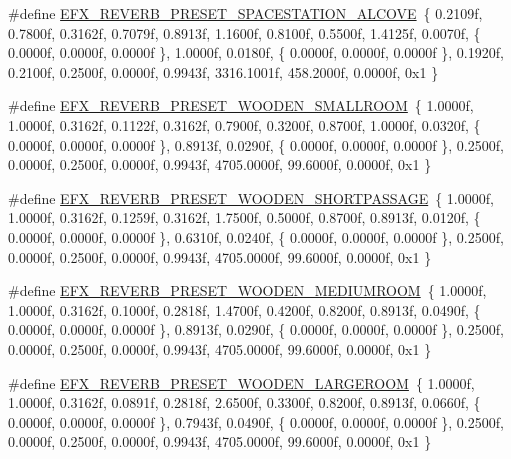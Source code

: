 \begin{DoxyCompactItemize}
\item 
\#define \mbox{\hyperlink{efx-presets_8h_aa9d3471810ca5d80f56f18841dd3abc8}{E\+F\+X\+\_\+\+R\+E\+V\+E\+R\+B\+\_\+\+P\+R\+E\+S\+E\+T\+\_\+\+S\+P\+A\+C\+E\+S\+T\+A\+T\+I\+O\+N\+\_\+\+A\+L\+C\+O\+VE}}~\{ 0.\+2109f, 0.\+7800f, 0.\+3162f, 0.\+7079f, 0.\+8913f, 1.\+1600f, 0.\+8100f, 0.\+5500f, 1.\+4125f, 0.\+0070f, \{ 0.\+0000f, 0.\+0000f, 0.\+0000f \}, 1.\+0000f, 0.\+0180f, \{ 0.\+0000f, 0.\+0000f, 0.\+0000f \}, 0.\+1920f, 0.\+2100f, 0.\+2500f, 0.\+0000f, 0.\+9943f, 3316.\+1001f, 458.\+2000f, 0.\+0000f, 0x1 \}
\item 
\#define \mbox{\hyperlink{efx-presets_8h_ab8ae77e2171d3d32a6f70b46ed47c6ff}{E\+F\+X\+\_\+\+R\+E\+V\+E\+R\+B\+\_\+\+P\+R\+E\+S\+E\+T\+\_\+\+W\+O\+O\+D\+E\+N\+\_\+\+S\+M\+A\+L\+L\+R\+O\+OM}}~\{ 1.\+0000f, 1.\+0000f, 0.\+3162f, 0.\+1122f, 0.\+3162f, 0.\+7900f, 0.\+3200f, 0.\+8700f, 1.\+0000f, 0.\+0320f, \{ 0.\+0000f, 0.\+0000f, 0.\+0000f \}, 0.\+8913f, 0.\+0290f, \{ 0.\+0000f, 0.\+0000f, 0.\+0000f \}, 0.\+2500f, 0.\+0000f, 0.\+2500f, 0.\+0000f, 0.\+9943f, 4705.\+0000f, 99.\+6000f, 0.\+0000f, 0x1 \}
\item 
\#define \mbox{\hyperlink{efx-presets_8h_aa4ba95f7f7d60162ca42c2c858290472}{E\+F\+X\+\_\+\+R\+E\+V\+E\+R\+B\+\_\+\+P\+R\+E\+S\+E\+T\+\_\+\+W\+O\+O\+D\+E\+N\+\_\+\+S\+H\+O\+R\+T\+P\+A\+S\+S\+A\+GE}}~\{ 1.\+0000f, 1.\+0000f, 0.\+3162f, 0.\+1259f, 0.\+3162f, 1.\+7500f, 0.\+5000f, 0.\+8700f, 0.\+8913f, 0.\+0120f, \{ 0.\+0000f, 0.\+0000f, 0.\+0000f \}, 0.\+6310f, 0.\+0240f, \{ 0.\+0000f, 0.\+0000f, 0.\+0000f \}, 0.\+2500f, 0.\+0000f, 0.\+2500f, 0.\+0000f, 0.\+9943f, 4705.\+0000f, 99.\+6000f, 0.\+0000f, 0x1 \}
\item 
\#define \mbox{\hyperlink{efx-presets_8h_a0e3f257cb084f192323997f347262c64}{E\+F\+X\+\_\+\+R\+E\+V\+E\+R\+B\+\_\+\+P\+R\+E\+S\+E\+T\+\_\+\+W\+O\+O\+D\+E\+N\+\_\+\+M\+E\+D\+I\+U\+M\+R\+O\+OM}}~\{ 1.\+0000f, 1.\+0000f, 0.\+3162f, 0.\+1000f, 0.\+2818f, 1.\+4700f, 0.\+4200f, 0.\+8200f, 0.\+8913f, 0.\+0490f, \{ 0.\+0000f, 0.\+0000f, 0.\+0000f \}, 0.\+8913f, 0.\+0290f, \{ 0.\+0000f, 0.\+0000f, 0.\+0000f \}, 0.\+2500f, 0.\+0000f, 0.\+2500f, 0.\+0000f, 0.\+9943f, 4705.\+0000f, 99.\+6000f, 0.\+0000f, 0x1 \}
\item 
\#define \mbox{\hyperlink{efx-presets_8h_aad9a3b46b19e2f641fd3cabe2e477ab6}{E\+F\+X\+\_\+\+R\+E\+V\+E\+R\+B\+\_\+\+P\+R\+E\+S\+E\+T\+\_\+\+W\+O\+O\+D\+E\+N\+\_\+\+L\+A\+R\+G\+E\+R\+O\+OM}}~\{ 1.\+0000f, 1.\+0000f, 0.\+3162f, 0.\+0891f, 0.\+2818f, 2.\+6500f, 0.\+3300f, 0.\+8200f, 0.\+8913f, 0.\+0660f, \{ 0.\+0000f, 0.\+0000f, 0.\+0000f \}, 0.\+7943f, 0.\+0490f, \{ 0.\+0000f, 0.\+0000f, 0.\+0000f \}, 0.\+2500f, 0.\+0000f, 0.\+2500f, 0.\+0000f, 0.\+9943f, 4705.\+0000f, 99.\+6000f, 0.\+0000f, 0x1 \}

\end{DoxyCompactItemize}
